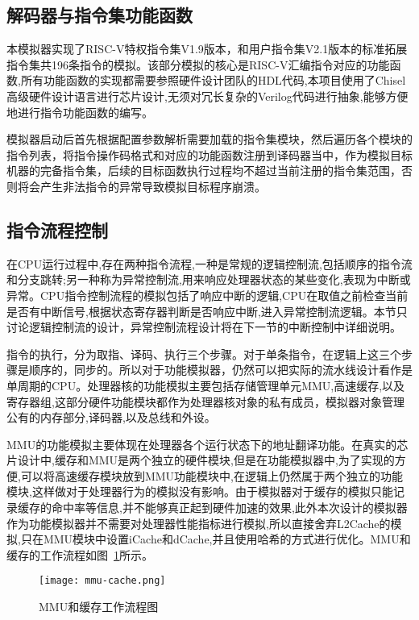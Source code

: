 \subsection{解码器与指令集功能函数}
本模拟器实现了RISC-V特权指令集V1.9版本，和用户指令集V2.1版本的标准拓展指令集共196条指令的模拟。该部分模拟的核心是RISC-V汇编指令对应的功能函数,所有功能函数的实现都需要参照硬件设计团队的HDL代码,本项目使用了Chisel高级硬件设计语言进行芯片设计,无须对冗长复杂的Verilog代码进行抽象,能够方便地进行指令功能函数的编写。


模拟器启动后首先根据配置参数解析需要加载的指令集模块，然后遍历各个模块的指令列表，将指令操作码格式和对应的功能函数注册到译码器当中，作为模拟目标机器的完备指令集，后续的目标函数执行过程均不超过当前注册的指令集范围，否则将会产生非法指令的异常导致模拟目标程序崩溃。


\subsection{指令流程控制}
在CPU运行过程中,存在两种指令流程,一种是常规的逻辑控制流,包括顺序的指令流和分支跳转;另一种称为异常控制流,用来响应处理器状态的某些变化,表现为中断或异常。CPU指令控制流程的模拟包括了响应中断的逻辑,CPU在取值之前检查当前是否有中断信号,根据状态寄存器判断是否响应中断,进入异常控制流逻辑。本节只讨论逻辑控制流的设计，异常控制流程设计将在下一节的中断控制中详细说明。


指令的执行，分为取指、译码、执行三个步骤。对于单条指令，在逻辑上这三个步骤是顺序的，同步的。所以对于功能模拟器，仍然可以把实际的流水线设计看作是单周期的CPU。处理器核的功能模拟主要包括存储管理单元MMU,高速缓存,以及寄存器组,这部分硬件功能模块都作为处理器核对象的私有成员，模拟器对象管理公有的内存部分,译码器,以及总线和外设。


MMU的功能模拟主要体现在处理器各个运行状态下的地址翻译功能。在真实的芯片设计中,缓存和MMU是两个独立的硬件模块,但是在功能模拟器中,为了实现的方便,可以将高速缓存模块放到MMU功能模块中,在逻辑上仍然属于两个独立的功能模块,这样做对于处理器行为的模拟没有影响。由于模拟器对于缓存的模拟只能记录缓存的命中率等信息,并不能够真正起到硬件加速的效果,此外本次设计的模拟器作为功能模拟器并不需要对处理器性能指标进行模拟,所以直接舍弃L2Cache的模拟,只在MMU模块中设置iCache和dCache,并且使用哈希的方式进行优化。MMU和缓存的工作流程如图~\ref{fig:mmu-process}所示。
\begin{figure}[H]
  \centering
  \texttt{[image: mmu-cache.png]}
  \caption{MMU和缓存工作流程图}
  \label{fig:mmu-process}
\end{figure}


